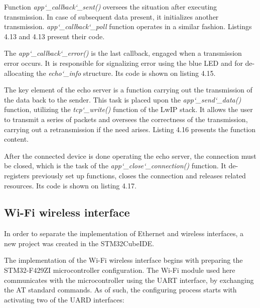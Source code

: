 
Function \textit{app\char`_callback\char`_sent()} oversees the situation after executing transmission. In case of subsequent data present, it initializes another transmission. \textit{app\char`_callback\char`_poll} function operates in a similar fashion. Listings 4.13 and 4.13 present their code.



The \textit{app\char`_callback\char`_error()} is the last callback, engaged when a transmission error occurs. It is responsible for signalizing error using the blue LED and for de-allocating the \textit{echo\char`_info} structure. Its code is shown on listing 4.15.


The key element of the echo server is a function carrying out the transmission of the data back to the sender. This task is placed upon the \textit{app\char`_send\char`_data()} function, utilizing the \textit{tcp\char`_write()} function of the LwIP stack. It allows the user to transmit a series of packets and oversees the correctness of the transmission, carrying out a retransmission if the need arises. Listing 4.16 presents the function content.


After the connected device is done operating the echo server, the connection must be closed, which is the task of the \textit{app\char`_close\char`_connection()} function. It de-registers previously set up functions, closes the connection and releases related resources. Its code is shown on listing 4.17.


\subsection{Wi-Fi wireless interface}

In order to separate the implementation of Ethernet and wireless interfaces, a new project was created in the STM32CubeIDE.

The implementation of the Wi-Fi wireless interface begins with preparing the STM32-F429ZI microcontroller configuration. The Wi-Fi module used here communicates with the microcontroller using the UART interface, by exchanging the AT standard commands. As of such, the configuring process starts with activating two of the UARD interfaces:


